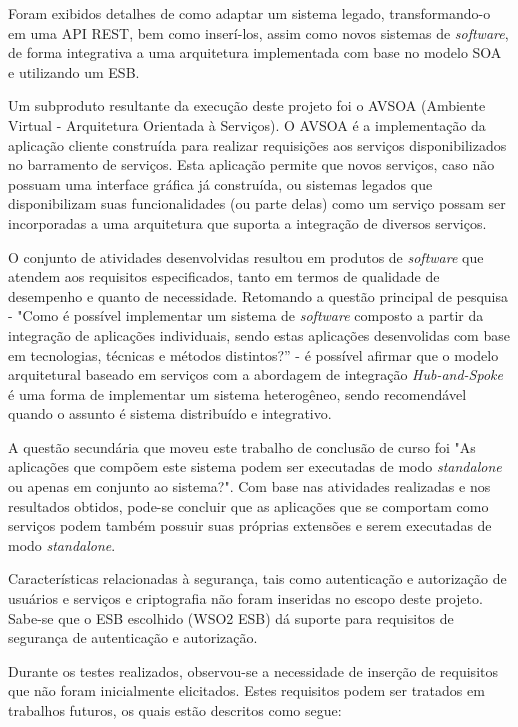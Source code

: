 Foram exibidos detalhes de como adaptar um sistema legado, transformando-o em uma API REST, bem como inserí-los, assim como novos sistemas de \textit{software}, de forma integrativa a uma arquitetura implementada com base no modelo SOA e utilizando um ESB.

Um subproduto resultante da execução deste projeto foi o AVSOA (Ambiente Virtual - Arquitetura Orientada à Serviços). O AVSOA é a implementação da aplicação cliente construída para realizar requisições aos serviços disponibilizados no barramento de serviços. Esta aplicação permite que novos serviços, caso não possuam uma interface gráfica já construída, ou sistemas legados que disponibilizam suas funcionalidades (ou parte delas) como um serviço possam ser incorporadas a uma arquitetura que suporta a integração de diversos serviços.

O conjunto de atividades desenvolvidas resultou em produtos de \textit{software} que atendem aos requisitos especificados, tanto em termos de qualidade de desempenho e quanto de necessidade. Retomando a questão principal de pesquisa - "Como é possível implementar um sistema de \textit{software} composto a partir da integração de aplicações individuais, sendo estas aplicações desenvolidas com base em tecnologias, técnicas e métodos distintos?'' - é possível afirmar que o modelo arquitetural baseado em serviços com a abordagem de integração \textit{Hub-and-Spoke} é uma forma de implementar um sistema heterogêneo, sendo recomendável quando o assunto é sistema distribuído e integrativo. 

A questão secundária que moveu este trabalho de conclusão de curso foi "As aplicações que compõem este sistema podem ser executadas de modo \textit{standalone} ou apenas em conjunto ao sistema?". Com base nas atividades realizadas e nos resultados obtidos, pode-se concluir que as aplicações que se comportam como serviços podem também possuir suas próprias extensões e serem executadas de modo \textit{standalone}.

Características relacionadas à segurança, tais como autenticação e autorização de usuários e serviços e criptografia não foram inseridas no escopo deste projeto. Sabe-se que o ESB escolhido (WSO2 ESB) dá suporte para requisitos de segurança de autenticação e autorização. 

Durante os testes realizados, observou-se a necessidade de inserção de requisitos que não foram inicialmente elicitados. Estes requisitos podem ser tratados em trabalhos futuros, os quais estão descritos como segue:

